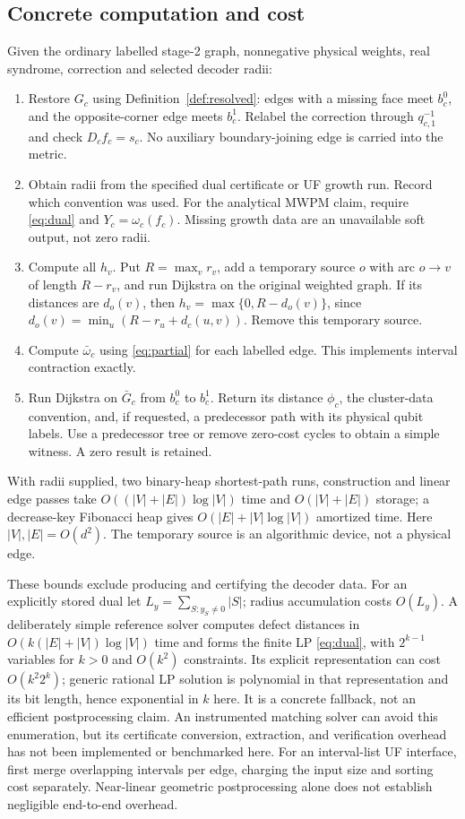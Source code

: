 \documentclass[11pt]{article}
\theoremstyle{definition}
\theoremstyle{plain}
\theoremstyle{remark}
\begin{document}
\subsection{Concrete computation and cost}
Given the ordinary labelled stage-2 graph, nonnegative physical
weights, real syndrome, correction and selected decoder radii:
\begin{enumerate}
 \item Restore $G_c$ using Definition~\ref{def:resolved}: edges with
 a missing face meet $b_c^0$, and the opposite-corner edge meets $b_c^1$.
 Relabel the correction through $q_{c,1}^{-1}$ and check $D_cf_c=s_c$.
 No auxiliary boundary-joining edge is carried into the metric.
 \item Obtain radii from the specified dual certificate or UF
 growth run. Record which convention was used. For the analytical
 MWPM claim, require \eqref{eq:dual} and $Y_c=\omega_c(f_c)$.
 Missing growth data are an unavailable soft output, not zero radii.
 \item Compute all $h_v$. Put $R=\max_v r_v$, add a temporary source
 $o$ with arc $o\to v$ of length $R-r_v$, and run Dijkstra on the
 original weighted graph. If its distances are $d_o(v)$, then
 $h_v=\max\{0,R-d_o(v)\}$, since
 $d_o(v)=\min_u(R-r_u+d_c(u,v))$. Remove this temporary source.
 \item Compute $\bar\omega_c$ using \eqref{eq:partial} for each
 labelled edge. This implements interval contraction exactly.
 \item Run Dijkstra on $\bar G_c$ from $b_c^0$ to $b_c^1$.
 Return its distance $\phi_c$, the cluster-data convention, and,
 if requested, a predecessor path with its physical qubit labels.
 Use a predecessor tree or remove zero-cost cycles to obtain a
 simple witness. A zero result is retained.
\end{enumerate}
With radii supplied, two binary-heap shortest-path runs, construction
and linear edge passes take $O((|V|+|E|)\log |V|)$ time and
$O(|V|+|E|)$ storage; a decrease-key Fibonacci heap gives
$O(|E|+|V|\log|V|)$ amortized time. Here $|V|,|E|=O(d^2)$.
The temporary source is an algorithmic device, not a physical edge.

These bounds exclude producing and certifying the decoder data.
For an explicitly stored dual let $L_y=\sum_{S:y_S\ne0}|S|$;
radius accumulation costs $O(L_y)$.
A deliberately simple reference solver computes defect distances in
$O(k(|E|+|V|)\log|V|)$ time and forms the finite LP
\eqref{eq:dual}, with $2^{k-1}$ variables for $k>0$ and $O(k^2)$
constraints. Its explicit representation can cost $O(k^2 2^k)$;
generic rational LP solution is polynomial in that representation
and its bit length, hence exponential in $k$ here. It is a concrete
fallback, not an efficient postprocessing claim.
An instrumented matching solver can avoid this enumeration, but its
certificate conversion, extraction, and verification overhead has
not been implemented or benchmarked here.
For an interval-list UF interface, first merge overlapping intervals
per edge, charging the input size and sorting cost separately.
Near-linear geometric postprocessing alone does not establish
negligible end-to-end overhead.
\end{document}
